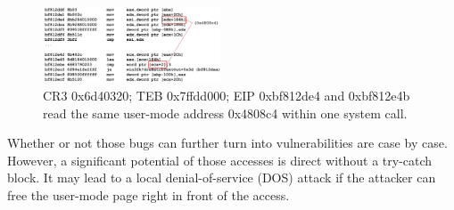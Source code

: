 \begin{figure}[th]
  \includegraphics[width=0.47\textwidth]{figures/doublefetch}
  \centering
  \caption{CR3 0x6d40320; TEB 0x7ffdd000; EIP 0xbf812de4 and 0xbf812e4b read the same user-mode address 0x4808c4 within one system call.}
  \label{fig:doublefetch}
\end{figure}


Whether or not those bugs can further turn into vulnerabilities are case by case. However, a significant potential of those accesses is direct without a try-catch block. It may lead to a local denial-of-service (DOS) attack if the attacker can free the user-mode page right in front of the access. 
